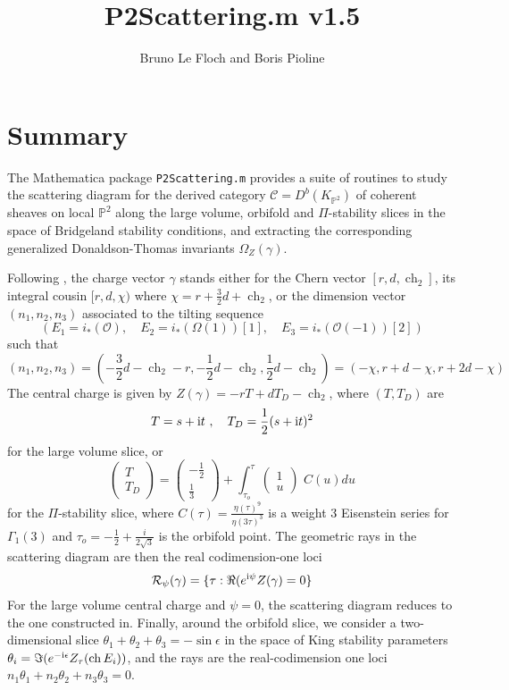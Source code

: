 \documentclass[12pt]{../JHEP3}
\title{P2Scattering.m v1.5}
\author{Bruno Le Floch and Boris Pioline}
\newcommand{\cC}{\mathcal{C}}
\newcommand{\cO}{\mathcal{O}}
\newcommand{\IP}{\mathbb{P}}
\newcommand{\be}{\begin{equation}}
\newcommand{\ee}{\end{equation}}
\newcommand{\cR}{\mathcal{R}}
\newcommand{\I}{{\rm i}}
\DeclareMathOperator{\ch}{ch}
\begin{document}
\maketitle

\baselineskip 15pt

\tableofcontents

\medskip

\section{Summary}

The  {\sc Mathematica} package {\tt P2Scattering.m} provides a suite of routines to study
the scattering diagram for the derived category $\cC=D^b(K_{\IP^2})$ of coherent sheaves on 
local $\IP^2$ along the large volume, orbifold and  $\Pi$-stability slices in the space of Bridgeland stability conditions, and extracting the corresponding generalized Donaldson-Thomas invariants $\Omega_Z(\gamma)$. 

Following \cite{P2Global}, the charge vector $\gamma$ stands either for 
the Chern vector $[r,d,\ch_2]$, its integral cousin $[r,d,\chi)$ where $\chi=r+\frac32d+\ch_2$,
or the dimension vector $(n_1,n_2,n_3)$ associated to the tilting sequence 
\be
(E_1=i_*(\cO), \quad E_2=i_*(\Omega(1))[1], \quad E_3 = i_*(\cO(-1))[2])
\ee
such that
\be
(n_1,n_2,n_3) = (-\frac32 d-\ch_2-r,  -\frac12 d-\ch_2, \frac12 d-\ch_2) = (-\chi, r+d-\chi,r+2d-\chi)
\ee
The central charge is given by $Z(\gamma)=-r T + d T_D -\ch_2$, where $(T,T_D)$ are 
\be
T= s+\I t\ ,\quad T_D = \frac12 (s+\I t)^2 
\ee 
for the large volume slice, or 
\be
\label{Eichler0}
 \begin{pmatrix} T \\ T_D  \end{pmatrix}
= \begin{pmatrix} -\frac12 \\ \frac13  \end{pmatrix} 
+  \int_{\tau_o}^{\tau} \begin{pmatrix} 1 \\u \end{pmatrix} \, 
\, C(u)  du
\ee
for the $\Pi$-stability slice, where $C (\tau) = \frac{\eta(\tau)^9}{\eta(3\tau)^3}$ is a
weight 3 Eisenstein series for $\Gamma_1(3)$ and $\tau_o=-\frac12+\frac{i}{2\sqrt3}$ is 
the orbifold point. The geometric rays in the scattering diagram are then the real codimension-one 
loci 
\be
\cR_\psi(\gamma) = \{ \tau : \Re(e^{\I\psi} Z(\gamma)=0 \}
\ee
For the large volume central charge and $\psi=0$, the scattering diagram reduces to the one
constructed in\cite{Bousseau:2019ift}.
Finally, around the orbifold slice, we 
consider a two-dimensional slice $\theta_1+\theta_2+\theta_3=-\sin\epsilon$ in the
space of King stability parameters $\theta_i=\Im(e^{-\I\epsilon} Z_\tau(\ch E_i))$, and the rays are
the real-codimension one loci $n_1\theta_1+n_2\theta_2+n_3\theta_3=0$. 
\end{document}

